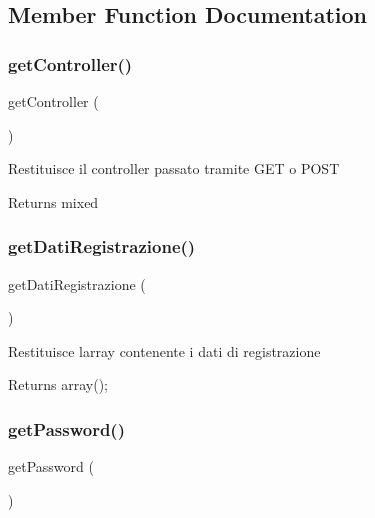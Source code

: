 \subsection{Member Function Documentation}
\mbox{\label{class_v_registrazione_aa8b89e0bad51878addc1300cd3e95b5c}} 
\subsubsection{\texorpdfstring{get\+Controller()}{getController()}}
{\footnotesize\ttfamily get\+Controller (\begin{DoxyParamCaption}{ }\end{DoxyParamCaption})}

Restituisce il controller passato tramite G\+ET o P\+O\+ST

\begin{DoxyReturn}{Returns}
mixed 
\end{DoxyReturn}
\mbox{\label{class_v_registrazione_a41fedff206621545a767261d3566a32d}} 
\subsubsection{\texorpdfstring{get\+Dati\+Registrazione()}{getDatiRegistrazione()}}
{\footnotesize\ttfamily get\+Dati\+Registrazione (\begin{DoxyParamCaption}{ }\end{DoxyParamCaption})}

Restituisce l\textquotesingle{}array contenente i dati di registrazione

\begin{DoxyReturn}{Returns}
array(); 
\end{DoxyReturn}
\mbox{\label{class_v_registrazione_a04e0957baeb7acde9c0c86556da2d43f}} 
\subsubsection{\texorpdfstring{get\+Password()}{getPassword()}}
{\footnotesize\ttfamily get\+Password (\begin{DoxyParamCaption}{ }\end{DoxyParamCaption})}

